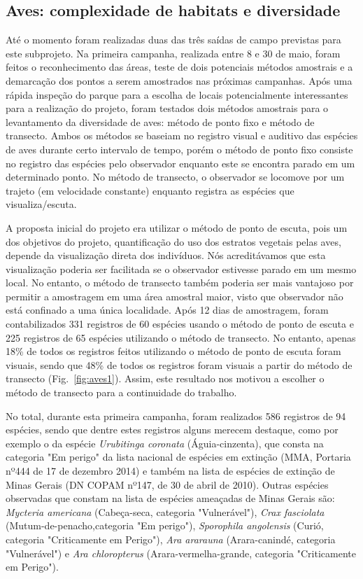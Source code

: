 \subsection{Aves: complexidade de habitats e diversidade} %
\label{sec:compl-de-habit} 

Até o momento foram realizadas duas das três saídas de campo previstas
para este subprojeto. Na primeira campanha, realizada entre 8 e 30 de
maio, foram feitos o reconhecimento das áreas, teste de dois
potenciais métodos amostrais e a demarcação dos pontos a serem
amostrados nas próximas campanhas. Após uma rápida inspeção do parque
para a escolha de locais potencialmente interessantes para a
realização do projeto, foram testados dois métodos amostrais para o
levantamento da diversidade de aves: método de ponto fixo e método de
transecto. Ambos os métodos se baseiam no registro visual e auditivo
das espécies de aves durante certo intervalo de tempo, porém o método
de ponto fixo consiste no registro das espécies pelo observador
enquanto este se encontra parado em um determinado ponto. No método de
transecto, o observador se locomove por um trajeto (em velocidade
constante) enquanto registra as espécies que visualiza/escuta.

A proposta inicial do projeto era utilizar o método de ponto de
escuta, pois um dos objetivos do projeto, quantificação do uso dos
estratos vegetais pelas aves, depende da visualização direta dos
indivíduos. Nós acreditávamos que esta visualização poderia ser
facilitada se o observador estivesse parado em um mesmo local. No
entanto, o método de transecto também poderia ser mais vantajoso por
permitir a amostragem em uma área amostral maior, visto que observador
não está confinado a uma única localidade. Após 12 dias de amostragem,
foram contabilizados 331 registros de 60 espécies usando o método de
ponto de escuta e 225 registros de 65 espécies utilizando o método de
transecto. No entanto, apenas 18\% de todos os registros feitos
utilizando o método de ponto de escuta foram visuais, sendo que 48\%
de todos os registros foram visuais a partir do método de transecto
(Fig.~\ref{fig:aves1}).  Assim, este resultado nos motivou a escolher o método de
transecto para a continuidade do trabalho.

No total, durante esta primeira campanha, foram realizados 586
registros de 94 espécies, sendo que dentre estes registros alguns
merecem destaque, como por exemplo o da espécie \textit{Urubitinga
coronata} (Águia-cinzenta), que consta na categoria "Em perigo" da
lista nacional de espécies em extinção (MMA, Portaria nº444 de 17 de
dezembro 2014) e também na lista de espécies de extinção de Minas
Gerais (DN COPAM nº147, de 30 de abril de 2010). Outras espécies
observadas que constam na lista de espécies ameaçadas de Minas Gerais
são: \textit{Mycteria americana} (Cabeça-seca, categoria
"Vulnerável"), \textit{Crax fasciolata} (Mutum-de-penacho,categoria
"Em perigo"), \textit{Sporophila angolensis} (Curió, categoria
"Criticamente em Perigo"), \textit{Ara ararauna} (Arara-canindé,
categoria "Vulnerável") e \textit{Ara chloropterus}
(Arara-vermelha-grande, categoria "Criticamente em Perigo").

